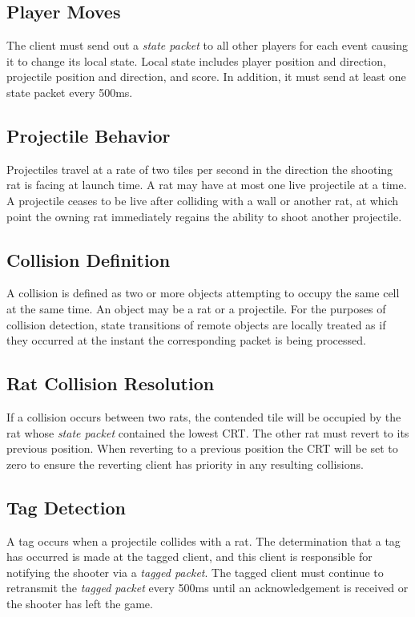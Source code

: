 \documentclass{article}
\begin{document}
\subsection{Player Moves}
The client must send out a \textit{state packet} to all other players for each
event causing it to change its local state. Local state includes
player position and direction, projectile position and direction, and
score. In addition, it must send at least one state packet every 500ms.

\subsection{Projectile Behavior}
Projectiles travel at a rate of two tiles per second in the direction
the shooting rat is facing at launch time.  A rat may have at most one
live projectile at a time.  A projectile ceases to be live after
colliding with a wall or another rat, at which point the owning rat
immediately regains the ability to shoot another projectile.

\subsection{Collision Definition}
\label{ssec:collision}
A collision is defined as two or more objects attempting to occupy the
same cell at the same time. An object may be a rat or a projectile.  For
the purposes of collision detection, state transitions of remote objects
are locally treated as if they occurred at the instant the corresponding
packet is being processed.

\subsection{Rat Collision Resolution}
If a collision occurs between two rats, the contended tile will be
occupied by the rat whose \textit{state packet} contained the lowest CRT. The
other rat must revert to its previous position.  When reverting to a
previous position the CRT will be set to zero to ensure the reverting
client has priority in any resulting collisions.

\subsection{Tag Detection}
\label{ssec:tagging}
A tag occurs when a projectile collides with a rat. The determination
that a tag has occurred is made at the tagged client, and this client is
responsible for notifying the shooter via a \textit{tagged packet}.
The tagged client must continue to retransmit the \textit{tagged packet}
every 500ms until an acknowledgement is received or the shooter has left
the game.
\end{document}
